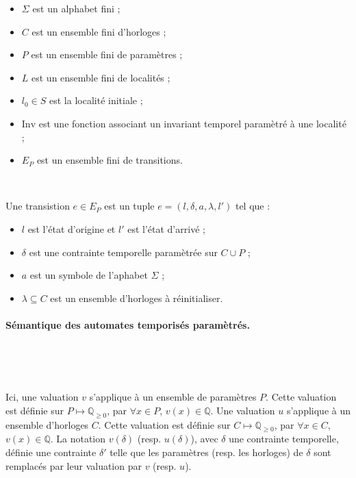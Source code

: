         \begin{itemize}
          \item $\Sigma$ est un alphabet fini ;
          \item $C$ est un ensemble fini d'horloges ;
          \item $P$ est un ensemble fini de paramètres ;
          \item $L$ est un ensemble fini de localités ;
          \item $l_0 \in S$ est la localité initiale ;
          \item $\mathrm{Inv}$ est une fonction associant un invariant temporel
            paramètré à une localité ;
          \item $E_P$ est un ensemble fini de transitions.
        \end{itemize}

        ~

        \noindent
        Une transistion $e \in E_P$ est un tuple $e = (l,\delta,a,\lambda,l')$
        tel que :
    
        \begin{itemize}
          \item $l$ est l'état d'origine et $l'$ est l'état d'arrivé ;
          \item $\delta$ est une contrainte temporelle paramètrée sur $C \cup P$
            ;
          \item $a$ est un symbole de l'aphabet $\Sigma$ ;
          \item $\lambda \subseteq C$ est un ensemble d'horloges à
            réinitialiser.
        \end{itemize}
        
      \paragraph{Sémantique des automates temporisés paramètrés.} ~
      
        ~
        
        Ici, une valuation $v$ s'applique à un ensemble de paramètres $P$. Cette
        valuation est définie sur $P \mapsto \mathbb{Q}_{\geq 0}$, par $\forall
        x \in P$, $v(x) \in \mathbb{Q}$. Une valuation $u$ s'applique à un
        ensemble d'horloges $C$. Cette valuation est définie sur $C \mapsto
        \mathbb{Q}_{\geq 0}$, par $\forall x \in C$, $v(x) \in \mathbb{Q}$. La
        notation $v(\delta)$ (resp. $u(\delta)$), avec $\delta$ une contrainte
        temporelle, définie une contrainte $\delta'$ telle que les paramètres
        (resp. les horloges) de $\delta$ sont remplacés par leur valuation
        par $v$ (resp. $u$).

